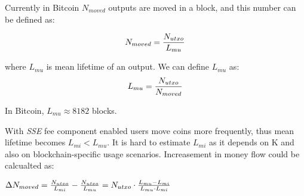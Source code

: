 \documentclass[]{article}   %
\newcommand{\authnote}[2]{\marginpar{\parbox{\marginparwidth}{\tiny %
  \textsf{#1 {\textcolor{blue}{notes: #2}}}}}%
  \textcolor{blue}{\textbf{\dag}}}
\newcommand{\authnote}[2]{
  \textsf{#1 \textcolor{blue}{: #2}}}
\newcommand{\authnote}[2]{}
\newcommand{\dnote}[1]{{\authnote{\textcolor{blue}{Dima notes}}{#1}}}
\newcommand{\esse}{\textit{SSE}}
\newcommand{\ignore}[1]{} %
\begin{document}
\ignore{
  If he uses blockchain with output size \textit{B} is relatively small and do not depend on output value.

  To estimate money flow let's assume, that user will move his money when space-time fee will start dominate over other transactional costs \dnote{why?}. Thus we can estimate expected mean output lifetime as

  \begin{equation}
  \label{eq:ltmean}
  L_{mean}={f_p \over K \cdot B}
  \end{equation}
}

Currently in Bitcoin $N_{moved}$ outputs are moved in a block, and this number can be defined as: 

\begin{equation}
N_{moved} = {N_{utxo} \over L_{mu}} %
\end{equation}

where $L_{mu}$ is mean lifetime of an output. We can define $L_{mu}$ as:
\begin{equation}
L_{mu} = {N_{utxo} \over {N_{moved}}}
\end{equation}

In Bitcoin, $L_{mu} \approx 8182$ blocks.


With \esse{} fee component enabled users move coins more frequently, thus mean lifetime becomes $L_{mi} < L_{mu}$. It is hard to estimate $L_{mi}$ as it depends on K and also on blockchain-specific usage scenarios. Increasement in money flow could be calcualted as:

$\Delta N_{moved} = {N_{utxo} \over L_{mi}} - {N_{utxo} \over L_{mu}} = N_{utxo} \cdot {{L_{mu}-L_{mi}} \over {L_{mu} \cdot L_{mi}}}$


\ignore{
  In the \textit{Scheduled payments} mode there is an additional component in the flow which is miners moving an output every $D_s$ blocks:

  \begin{equation}
    N_{scheduled} \approx {N_{utxo} \over D_s}
  \end{equation}



  We can find a ratio between $N_{incentivized}$ and ${moved}$:

  \begin{equation}
    r_{flow} = {N_{incentivized} \over N_{moved}}  \approx {8180 \over L_{max-mean}} %
  \end{equation}

  For example, if a user pays for $8180$ blocks~(about 57 days) on average in the \textit{Prepaid} model, money flow doubles in comparison with a system without \esse{} component.  


  For \textit{Scheduled payments}:

  \begin{equation}
    r_{flow} = {{N_{incentivized} + N_{scheduled}} \over N_{moved}} %
  \end{equation}
}
\end{document}
